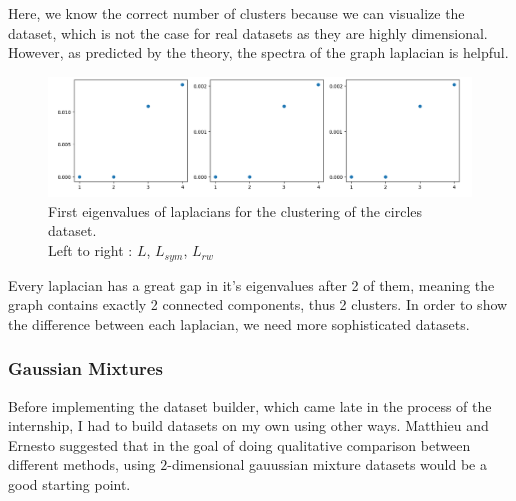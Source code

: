 \documentclass[a4paper,12pt]{article}
\theoremstyle{definition}
\theoremstyle{plain}
\begin{document}
Here, we know the correct number of clusters because we can visualize the dataset, which is not the case for real datasets as they are highly dimensional. However, as predicted by the theory, the spectra of the graph laplacian is helpful.


\begin{figure}[H]
	\captionsetup{justification=centering}
	\centering
	\includegraphics[width=1.1\linewidth]{figures/Fig_E1_circles}
	\caption{First eigenvalues of laplacians for the clustering of the circles dataset. \\ Left to right : $L$, $L_{sym}$, $L_{rw}$}
	\label{fig:fige1circles}
\end{figure}

Every laplacian has a great gap in it's eigenvalues after 2 of them, meaning the graph contains exactly 2 connected components, thus 2 clusters.
In order to show the difference between each laplacian, we need more sophisticated datasets.

\subsubsection{Gaussian Mixtures}
Before implementing the dataset builder, which came late in the process of the internship, I had to build datasets on my own using other ways. Matthieu and Ernesto suggested that in the goal of doing qualitative comparison between different methods, using $2$-dimensional gauussian mixture datasets would be a good starting point. 
\end{document}
